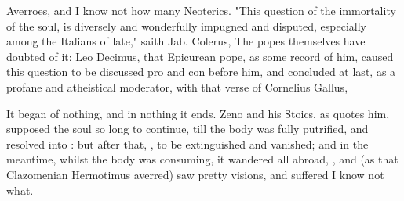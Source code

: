 Averroes, and I know not how many Neoterics. "This
question of the immortality of the soul, is diversely and wonderfully impugned
and disputed, especially among the Italians of late," saith Jab. Colerus,
 The popes themselves
have doubted of it: Leo Decimus, that Epicurean pope, as
some record of him, caused this question to be discussed
pro and con before him, and concluded at last, as a profane and atheistical
moderator, with that verse of Cornelius Gallus,

%

It began of nothing, and in nothing it ends. Zeno and his Stoics, as
\Austin{} quotes him, supposed the soul so long to continue,
till the body was fully putrified, and resolved into : but
after that, , to be extinguished and vanished; and in
the meantime, whilst the body was consuming, it wandered all abroad, , and (as that Clazomenian Hermotimus averred) saw
pretty visions, and suffered I know not what.


